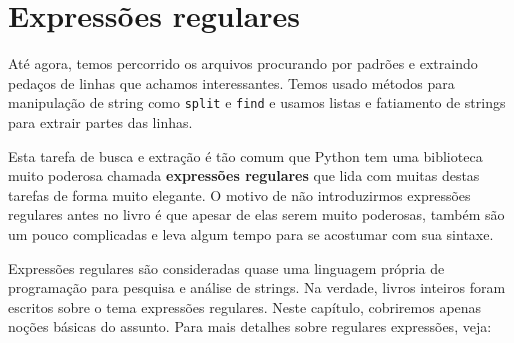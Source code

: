 
\chapter{Expressões regulares}

Até agora, temos percorrido os arquivos procurando por padrões e extraindo
pedaços de linhas que achamos interessantes. Temos usado métodos para
manipulação de string como {\tt split} e {\tt find} e usamos listas e
fatiamento de strings para extrair partes das linhas.


Esta tarefa de busca e extração é tão comum que Python tem uma biblioteca
muito poderosa chamada {\bf expressões regulares} que lida com muitas destas
tarefas de forma muito elegante. O motivo de não introduzirmos expressões
regulares antes no livro é que apesar de elas serem muito poderosas, também
são um pouco complicadas e leva algum tempo para se acostumar com sua sintaxe.

Expressões regulares são consideradas quase uma linguagem própria de
programação para pesquisa e análise de strings. Na verdade, livros inteiros
foram escritos sobre o tema expressões regulares. Neste capítulo, cobriremos
apenas noções básicas do assunto. Para mais detalhes sobre regulares
expressões, veja:


